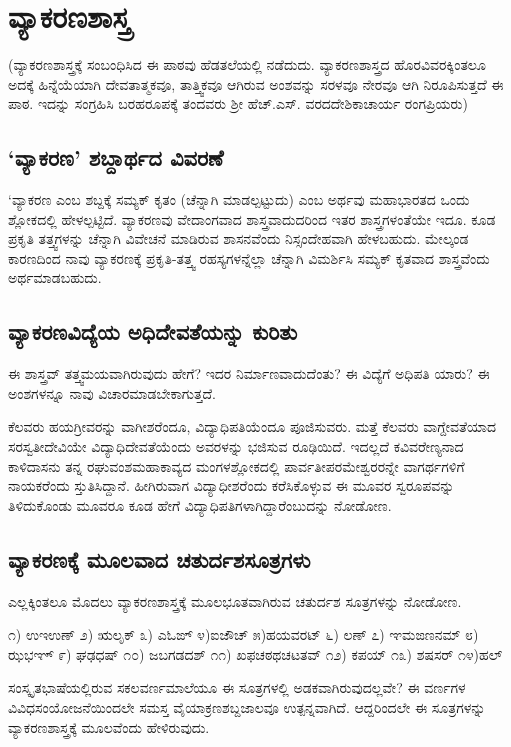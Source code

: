 \chapter{ವ್ಯಾಕರಣಶಾಸ್ತ್ರ}

(ವ್ಯಾಕರಣಶಾಸ್ತ್ರಕ್ಕೆ ಸಂಬಂಧಿಸಿದ ಈ ಪಾಠವು  ಹೆಡತಲೆಯಲ್ಲಿ ನಡೆದುದು. ವ್ಯಾಕರಣಶಾಸ್ತ್ರದ ಹೊರವಿವರಕ್ಕಿಂತಲೂ ಅದಕ್ಕೆ ಹಿನ್ನೆಯೆಯಾಗಿ ದೇವತಾತ್ಮಕವೂ, ತಾತ್ತ್ವಿಕವೂ ಆಗಿರುವ ಅಂಶವನ್ನು ಸರಳವೂ ನೇರವೂ ಆಗಿ ನಿರೂಪಿಸುತ್ತದೆ ಈ ಪಾಠ. ಇದನ್ನು ಸಂಗ್ರಹಿಸಿ ಬರಹರೂಪಕ್ಕೆ ತಂದವರು ಶ್ರೀ ಹೆಚ್.ಎಸ್. ವರದದೇಶಿಕಾಚಾರ್ಯ ರಂಗಪ್ರಿಯರು)

\section*{`ವ್ಯಾಕರಣ' ಶಬ್ದಾರ್ಥದ ವಿವರಣೆ}

`ವ್ಯಾಕರಣ ಎಂಬ ಶಬ್ದಕ್ಕೆ ಸಮ್ಯಕ್ ಕೃತಂ (ಚೆನ್ನಾಗಿ ಮಾಡಲ್ಪಟ್ಟುದು) ಎಂಬ ಅರ್ಥವು ಮಹಾಭಾರತದ ಒಂದು ಶ್ಲೋಕದಲ್ಲಿ ಹೇಳಲ್ಪಟ್ಟಿದೆ. ವ್ಯಾಕರಣವು  ವೇದಾಂಗವಾದ ಶಾಸ್ತ್ರವಾದುದರಿಂದ ಇತರ ಶಾಸ್ತ್ರಗಳಂತೆಯೇ ಇದೂ. ಕೂಡ ಪ್ರಕೃತಿ ತತ್ತ್ವಗಳನ್ನು ಚೆನ್ನಾಗಿ ವಿವೇಚನೆ ಮಾಡಿರುವ ಶಾಸನವೆಂದು ನಿಸ್ಸಂದೇಹವಾಗಿ ಹೇಳಬಹುದು. ಮೇಲ್ಕಂಡ ಕಾರಣದಿಂದ ನಾವು ವ್ಯಾಕರಣಕ್ಕೆ ಪ್ರಕೃತಿ-ತತ್ತ್ವ  ರಹಸ್ಯಗಳನ್ನೆಲ್ಲಾ ಚೆನ್ನಾಗಿ ವಿಮರ್ಶಿಸಿ ಸಮ್ಯಕ್ ಕೃತವಾದ ಶಾಸ್ತ್ರವೆಂದು ಅರ್ಥಮಾಡಬಹುದು.

\section*{ವ್ಯಾಕರಣವಿದ್ಯೆಯ ಅಧಿದೇವತೆಯನ್ನು ಕುರಿತು}

ಈ ಶಾಸ್ತ್ರವ್ ತತ್ತ್ವಮಯವಾಗಿರುವುದು ಹೇಗೆ? ಇದರ ನಿರ್ಮಾಣವಾದುದೆಂತು? ಈ ವಿದ್ಯೆಗೆ ಅಧಿಪತಿ  ಯಾರು? ಈ ಅಂಶಗಳನ್ನೂ ನಾವು ವಿಚಾರಮಾಡಬೇಕಾಗುತ್ತದೆ.

ಕೆಲವರು ಹಯಗ್ರೀವರನ್ನು ವಾಗೀಶರೆಂದೂ, ವಿದ್ಯಾಧಿಪತಿಯೆಂದೂ ಪೂಜಿಸುವರು. ಮತ್ತೆ ಕೆಲವರು ವಾಗ್ದೇವತೆಯಾದ ಸರಸ್ವತೀದೇವಿಯೇ ವಿದ್ಯಾಧಿದೇವತೆಯೆಂದು ಅವರಳನ್ನು ಭಜಿಸುವ ರೂಢಿಯಿದೆ. ಇದಲ್ಲದೆ ಕವಿವರೇಣ್ಯನಾದ ಕಾಳಿದಾಸನು ತನ್ನ ರಘುವಂಶಮಹಾಕಾವ್ಯದ ಮಂಗಳಶ್ಲೋಕದಲ್ಲಿ ಪಾರ್ವತೀಪರಮೇಶ್ವರರನ್ನೇ ವಾಗರ್ಥಗಳಿಗೆ ನಾಯಕರೆಂದು ಸ್ತುತಿಸಿದ್ದಾನೆ. ಹೀಗಿರುವಾಗ ವಿದ್ಯಾಧೀಶರೆಂದು ಕರೆಸಿಕೊಳ್ಳುವ ಈ ಮೂವರ ಸ್ವರೂಪವನ್ನು ತಿಳಿದುಕೊಂಡು ಮೂವರೂ ಕೂಡ ಹೇಗೆ ವಿದ್ಯಾಧಿಪತಿಗಳಾಗಿದ್ದಾರೆಂಬುದನ್ನು ನೋಡೋಣ.

\section*{ವ್ಯಾಕರಣಕ್ಕೆ ಮೂಲವಾದ ಚತುರ್ದಶಸೂತ್ರಗಳು}

ಎಲ್ಲಕ್ಕಿಂತಲೂ ಮೊದಲು ವ್ಯಾಕರಣಶಾಸ್ತ್ರಕ್ಕೆ  ಮೂಲಭೂತವಾಗಿರುವ ಚತುರ್ದಶ ಸೂತ್ರಗಳನ್ನು ನೋಡೋಣ.

೧) ಉಇಉಣ್  ೨) ಋಲೃಕ್ ೩) ಎಓಙ್ ೪)ಐಜೌಚ್ ೫)ಹಯವರಟ್ ೬) ಲಣ್  ೭) ಞಮಙಣನಮ್ ೮) ಝಭಞ್    ೯) ಘಢಧಷ್
 ೧೦) ಜಬಗಡದಶ್ ೧೧) ಖಫಚಠಥಚಟತವ್ ೧೨) ಕಪಯ್ ೧೩) ಶಷಸರ್ ೧೪)ಹಲ್
  
ಸಂಸ್ಕೃತಭಾಷೆಯಲ್ಲಿರುವ ಸಕಲವರ್ಣಮಾಲೆಯೂ ಈ ಸೂತ್ರಗಳಲ್ಲಿ ಅಡಕವಾಗಿರುವುದಲ್ಲವೇ? ಈ ವರ್ಣಗಳ ವಿವಿಧಸಂಯೋಜನೆಯಿಂದಲೇ ಸಮಸ್ತ ವೈಯಾಕ್ರಣಶಬ್ದಜಾಲವೂ ಉತ್ಪನ್ನವಾಗಿದೆ. ಆದ್ದರಿಂದಲೇ ಈ ಸೂತ್ರಗಳನ್ನು ವ್ಯಾಕರಣಶಾಸ್ತ್ರಕ್ಕೆ ಮೂಲವೆಂದು ಹೇಳಿರುವುದು.

